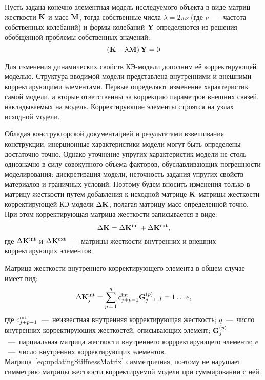 Пусть задана конечно-элементная модель исследуемого объекта в виде матриц жесткости $ \mathbf{K} $ и масс $ \mathbf{M} $, тогда собственные числа $ \lambda = 2 \pi \nu $ (где $ \nu $~---~частота собственных колебаний) и формы колебаний $ \mathbf{Y} $ определяются из решения обобщённой проблемы собственных значений:
\begin{equation}
	\left( \mathbf{K} - \uplambda \mathbf{M} \right) \mathbf{Y} = 0
\end{equation}

Для изменения динамических свойств КЭ-модели дополним её корректирующей моделью. Структура вводимой модели представлена внутренними и внешними корректирующими элементами. Первые определяют изменение характеристик самой модели, а вторые ответственны за коррекцию параметров внешних связей, накладываемых на модель. Корректирующие элементы строятся на узлах исходной модели. 

Обладая конструкторской документацией и результатами взвешивания конструкции, инерционные характеристики модели могут быть определены достаточно точно. Однако уточнение упругих характеристик модели не столь однозначно в силу совокупного объема факторов, обуславливающих погрешности моделирования: дискретизация модели, неточность задания упругих свойств материалов и граничных условий. Поэтому будем вносить изменения только в матрицу жесткости путем добавления к исходной матрице $ \mathbf{K} $ матрицы жесткости корректирующей КЭ-модели $ \Delta \mathbf{K} $, полагая матрицу масс определенной точно. При этом корректирующая матрица жесткости записывается в виде:
\begin{equation}
	\Delta \mathbf{K} = \Delta \mathbf{K} ^ {\text{int}} + \Delta \mathbf{K} ^ {\text{ext}}, \label{eq:stiffMatrixDecomposition}
\end{equation}
где $ \Delta \mathbf{K} ^ {\text{int}} $ и $ \Delta \mathbf{K} ^ {\text{ext}} $~---~матрицы жесткости внутренних и внешних корректирующих элементов.

Матрица жесткости внутреннего корректирующего элемента в общем случае имеет вид:
\begin{equation}
	\Delta \mathbf{K} ^ {\text{int}}_j = \sum\limits_{p\,=\,1}^{q} c ^ {\text{int}}_{j+p-1} \mathbf{G}_j^{(p)}, \ j = 1 \hdots e, \label{eq:updatingStiffnessMatrix}
\end{equation}
где $ c ^ {\text{int}}_{j+p-1} $~---~неизвестная внутренняя корректирующая жесткость; $ q $~---~число внутренних корректирующих жесткостей, описывающих элемент; $ \mathbf{G}_j^{(p)} $~---~парциальная матрица жесткости внутреннего коррректирующего элемента; $ e $~---~число внутренних корректирующих элементов. Матрица~\eqref{eq:updatingStiffnessMatrix} симметричная, поэтому не нарушает симметрию матрицы жесткости корректируемой модели при суммировании с ней.

